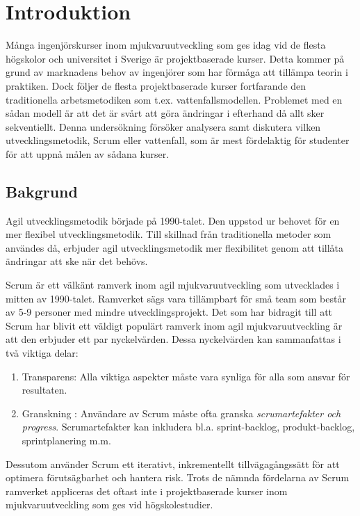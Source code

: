 \section{Introduktion}
\label{sec:Lieth_Wahid-introduction}
Många ingenjörskurser inom mjukvaruutveckling som ges idag vid de flesta högskolor och universitet i Sverige är projektbaserade kurser. Detta kommer på grund av marknadens behov av ingenjörer som har förmåga att tillämpa teorin i praktiken. Dock följer de flesta projektbaserade kurser fortfarande den traditionella arbetsmetodiken som t.ex. vattenfallsmodellen. Problemet med en sådan modell är att det är svårt att göra ändringar i efterhand då allt sker sekventiellt. Denna undersökning försöker analysera samt diskutera vilken utvecklingsmetodik, Scrum eller vattenfall, som är mest fördelaktig för studenter för att uppnå målen av sådana kurser.

\subsection{Bakgrund}
Agil utvecklingsmetodik började på 1990-talet. Den uppstod ur behovet för en mer flexibel utvecklingsmetodik. Till skillnad från traditionella metoder som användes då, erbjuder agil utvecklingsmetodik mer flexibilitet genom att tillåta ändringar att ske när det behövs.

Scrum är ett välkänt ramverk inom agil mjukvaruutveckling som utvecklades i mitten av 1990-talet.\cite{TheScrum} 
Ramverket sägs vara tillämpbart för små team som består av 5-9 personer med mindre utvecklingsprojekt. Det som har bidragit till att Scrum har blivit ett väldigt populärt ramverk inom agil mjukvaruutveckling är att den erbjuder ett par nyckelvärden. Dessa nyckelvärden kan sammanfattas i två viktiga delar: 
\begin{enumerate}\label{two}
	\item Transparens: Alla viktiga aspekter måste vara synliga för alla som ansvar för resultaten.\cite{TheScrum}
	\item Granskning : Användare av Scrum måste ofta granska \textit{scrumartefakter och progress}. Scrumartefakter kan inkludera
	bl.a. sprint-backlog, produkt-backlog, sprintplanering m.m.\cite{TheScrum}
\end{enumerate} 
Dessutom använder Scrum ett iterativt, inkrementellt tillvägagångssätt för att optimera förutsägbarhet och hantera risk.\cite{TheScrum} Trots de nämnda fördelarna av Scrum ramverket appliceras det oftast inte i projektbaserade kurser inom mjukvaruutveckling som ges vid högskolestudier. 

